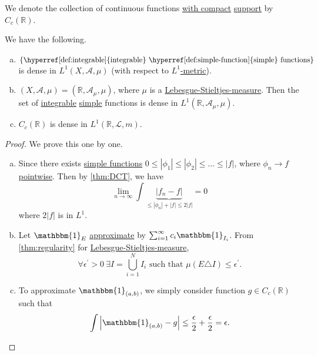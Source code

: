 \begin{notation}
	We denote the collection of continuous functions \underline{with compact} \hyperref[def:support]{support} by \(C_c(\mathbb{R} )\).
\end{notation}

\begin{theorem}
	We have the following.
	\begin{enumerate}[(a)]
		\item \(\{\text{\hyperref[def:integrable]{integrable} \hyperref[def:simple-function]{simple} functions} \}\) is dense
		      in \(L^1(X, \mathcal{A} , \mu )\) (with respect to \hyperref[def:L-1-metric]{\(L^1\)-metric}).
		\item \((X, \mathcal{A} , \mu ) = (\mathbb{R} , \mathcal{A} _\mu , \mu )\),
		      where \(\mu\) is a \hyperref[def:Lebesgue-Stieltjes-measure]{Lebesgue-Stieltjes-measure}. Then
		      the set of \hyperref[def:integrable]{integrable} \hyperref[def:simple-function]{simple} functions
		      is dense in \(L^1(\mathbb{R} , \mathcal{A} _\mu , \mu )\).
		\item \(C_c(\mathbb{R} )\) is dense in \(L^1(\mathbb{R} , \hyperref[def:Lebesgue-measure]{\mathcal{L} , m})\).
	\end{enumerate}
\end{theorem}
\begin{proof}
	We prove this one by one.
	\begin{enumerate}[(a)]
		\item Since there exists \hyperref[def:simple-function]{simple functions} \(0\leq \left\vert \phi _1 \right\vert \leq \left\vert \phi _2 \right\vert\leq \dots \leq \left\vert f \right\vert  \),
		      where \(\phi _{n}\to f\) \hyperref[def:pointwise-convergence]{pointwise}. Then by \autoref{thm:DCT}, we have
		      \[
			      \lim_{n \to \infty} \int \underbrace{\left\vert f_{n} - f\right\vert }_{\leq \left\vert \phi _{n} \right\vert + \left\vert f  \right\vert\leq 2\left\vert f \right\vert } = 0
		      \]
		      where \(2\left\vert f \right\vert \) is in \(L^1\).
		\item Let \(\mathbbm{1}_{E} \) \underline{approximate} by \(\sum_{i=1}^{\infty} c_{i}\mathbbm{1}_{I_{i}} \). From \autoref{thm:regularity} for
		      \hyperref[def:Lebesgue-Stieltjes-measure]{Lebesgue-Stieltjes-measure},
		      \[
			      \forall \epsilon ^\prime >0\ \exists I = \bigcup_{i=1}^{N} I_{i}\text{ such that } \mu (E\triangle I)\leq \epsilon ^\prime .
		      \]
		\item To approximate \(\mathbbm{1}_{(a, b)} \), we simply consider function \(g\in C_c(\mathbb{R} )\) such that
		      \[
			      \int \left\vert \mathbbm{1}_{(a, b)} - g \right\vert \leq \frac{\epsilon}{2} + \frac{\epsilon}{2} = \epsilon .
		      \]
	\end{enumerate}
\end{proof}